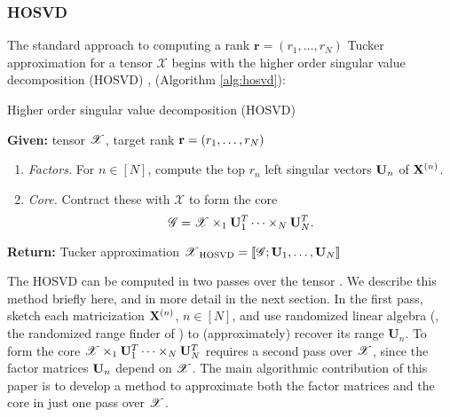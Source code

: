 \subsubsection{HOSVD}
The standard approach to computing a rank $\mathbf{r} = (r_1, \ldots, r_N)$ Tucker approximation for a tensor $\mathscr{X}$
begins with the higher order singular value decomposition (HOSVD) \citep{de2000multilinear,tucker1966some},
(Algorithm \ref{alg:hosvd}): %
\begin{algorithm}[ht]
  \caption{Higher order singular value decomposition (HOSVD)
	\citep{de2000multilinear,tucker1966some}
	\label{alg:hosvd}}
  \textbf{Given:} tensor $\T{X}$, target rank $\mathbf{r} = (r_1, \ldots, r_N)$
  \begin{enumerate}
  \item \emph{Factors.} For $n \in [N]$, compute the top $r_n$ left singular vectors $\mathbf{U}_n$
  of $\mathbf{X}^{(n)}$.
  \item \emph{Core.} Contract these with $\mathscr{X}$ to form the core
  \[
  \T{G} = \T{X} \times_1 \M{U}_1^T \cdots \times_N \M{U}_N^T.
  \]
  \end{enumerate}
  \textbf{Return:} Tucker approximation $\T{X}_{\rm{HOSVD}} = \llbracket\T{G}; \M{U}_1, \ldots, \M{U}_N \rrbracket$
\end{algorithm}

The HOSVD can be computed in two passes over the tensor
\citep{zhou2014decomposition, battaglino2019faster}.
We describe this method briefly here, and in more detail in the next section.
In the first pass, sketch each matricization $\mathbf{X}^{(n)}$, $n \in [N]$,
and use randomized linear algebra
(\eg, the randomized range finder of \citep{halko2011finding})
to (approximately) recover its range $\mathbf{U}_n$.
To form the core $\T{X} \times_1 \M{U}_1^T \cdots \times_N \M{U}_N^T$
requires a second pass over $\T{X}$, since the factor matrices $\mathbf{U}_n$
depend on $\T{X}$.
The main algorithmic contribution of this paper is to develop a method to
approximate both the factor matrices and the core in just one pass over $\T{X}$.

